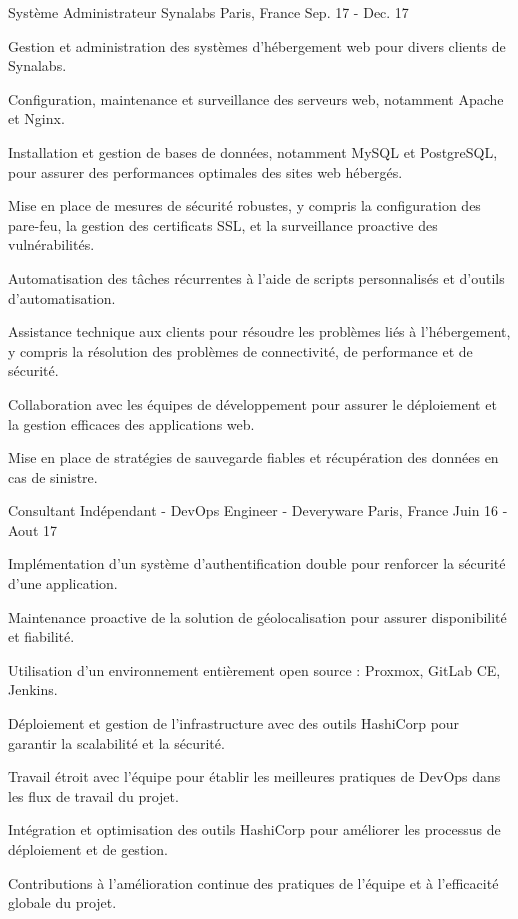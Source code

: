 \begin{cventries}
\cventry
{Système Administrateur} %
{Synalabs} %
{Paris, France} %
{Sep. 17 - Dec. 17 } %
{
  \begin{cvitems} %
    \item {Gestion et administration des systèmes d'hébergement web pour divers clients de Synalabs.}
    \item {Configuration, maintenance et surveillance des serveurs web, notamment Apache et Nginx.}
    \item {Installation et gestion de bases de données, notamment MySQL et PostgreSQL, pour assurer des performances optimales des sites web hébergés.}
    \item {Mise en place de mesures de sécurité robustes, y compris la configuration des pare-feu, la gestion des certificats SSL, et la surveillance proactive des vulnérabilités.}
    \item {Automatisation des tâches récurrentes à l'aide de scripts personnalisés et d'outils d'automatisation.}
    \item {Assistance technique aux clients pour résoudre les problèmes liés à l'hébergement, y compris la résolution des problèmes de connectivité, de performance et de sécurité.}
    \item {Collaboration avec les équipes de développement pour assurer le déploiement et la gestion efficaces des applications web.}
    \item {Mise en place de stratégies de sauvegarde fiables et récupération des données en cas de sinistre.}
  \end{cvitems}
}

\cventry
{Consultant Indépendant - DevOps Engineer -} %
{Deveryware} %
{Paris, France} %
{Juin 16 - Aout 17} %
{
  \begin{cvitems} %
    \item {Implémentation d'un système d'authentification double pour renforcer la sécurité d'une application.}
    \item {Maintenance proactive de la solution de géolocalisation pour assurer disponibilité et fiabilité.}
    \item {Utilisation d'un environnement entièrement open source : Proxmox, GitLab CE, Jenkins.}
    \item {Déploiement et gestion de l'infrastructure avec des outils HashiCorp pour garantir la scalabilité et la sécurité.}
    \item {Travail étroit avec l'équipe pour établir les meilleures pratiques de DevOps dans les flux de travail du projet.}
    \item {Intégration et optimisation des outils HashiCorp pour améliorer les processus de déploiement et de gestion.}
    \item {Contributions à l'amélioration continue des pratiques de l'équipe et à l'efficacité globale du projet.}
  \end{cvitems}
}


\end{cventries}
